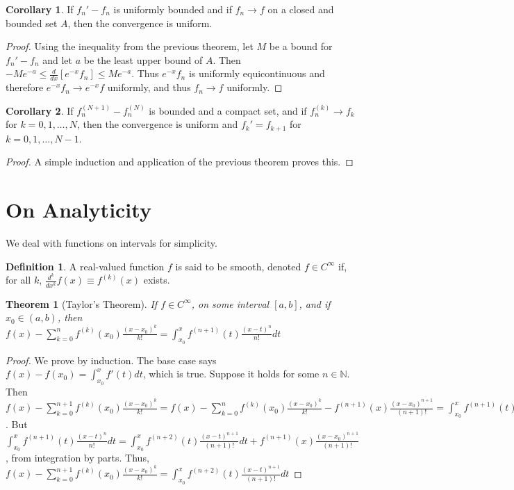 \documentclass[oneside]{book}
\newtheorem{theorem}{Theorem}[section]
\theoremstyle{definition}
\newtheorem{definition}{Definition}[section]
\newtheorem{corollary}{Corollary}[section]
\begin{document}
\begin{corollary}
If $f_n' - f_n$ is uniformly bounded and if $f_n \rightarrow f$ on a closed and bounded set $A$, then the convergence is uniform.
\end{corollary}
\begin{proof}
Using the inequality from the previous theorem, let $M$ be a bound for $f_n'-f_n$ and let $a$ be the least upper bound of $A$. Then $-Me^{-a}\leq \frac{d}{dx}[e^{-x}f_n] \leq Me^{-a}$. Thus $e^{-x}f_n$ is uniformly equicontinuous and therefore $e^{-x}f_n\rightarrow e^{-x}f$ uniformly, and thus $f_n\rightarrow f$ uniformly.
\end{proof}

\begin{corollary}
If $f_n^{(N+1)}-f_n^{(N)}$ is bounded and a compact set, and if $f_n^{(k)}\rightarrow f_k$ for $k=0,1,\hdots, N$, then the convergence is uniform and $f_{k}' = f_{k+1}$ for $k=0,1,\hdots,N-1$.
\end{corollary}
\begin{proof}
A simple induction and application of the previous theorem proves this.
\end{proof}

\section{On Analyticity}

We deal with functions on intervals for simplicity.

\begin{definition}
A real-valued function $f$ is said to be smooth, denoted $f\in C^{\infty}$ if, for all $k$, $\frac{d^k}{dx^k}f(x) \equiv f^{(k)}(x)$ exists.
\end{definition}

\begin{theorem}[Taylor's Theorem]
If $f\in C^{\infty}$, on some interval $[a,b]$, and if $x_0\in (a,b)$, then $f(x) - \sum_{k=0}^{n} f^{(k)}(x_0)\frac{(x-x_0)^k}{k!} = \int_{x_0}^{x} f^{(n+1)}(t)\frac{(x-t)^n}{n!}dt$
\end{theorem}
\begin{proof}
We prove by induction. The base case says $f(x)-f(x_0) = \int_{x_0}^{x} f'(t)dt$, which is true. Suppose it holds for some $n\in \mathbb{N}$. Then $f(x)-\sum_{k=0}^{n+1} f^{(k)}(x_0)\frac{(x-x_0)^k}{k!} = f(x)-\sum_{k=0}^{n} f^{(k)}(x_0)\frac{(x-x_0)^k}{k!} - f^{(n+1)}(x)\frac{(x-x_0)^{n+1}}{(n+1)!} = \int_{x_0}^{x} f^{(n+1)}(t)\frac{(x-t)^n}{n!}dt - f^{(n+1)}(x)\frac{(x-x_0)^{n+1}}{(n+1)!}$. But $\int_{x_0}^{x} f^{(n+1)}(t)\frac{(x-t)^n}{n!}dt =  \int_{x_0}^{x} f^{(n+2)}(t) \frac{(x-t)^{n+1}}{(n+1)!} dt + f^{(n+1)}(x)\frac{(x-x_0)^{n+1}}{(n+1)!}$, from integration by parts. Thus, $f(x)-\sum_{k=0}^{n+1} f^{(k)}(x_0)\frac{(x-x_0)^k}{k!}= \int_{x_0}^{x} f^{(n+2)}(t) \frac{(x-t)^{n+1}}{(n+1)!} dt$
\end{proof}
\end{document}
